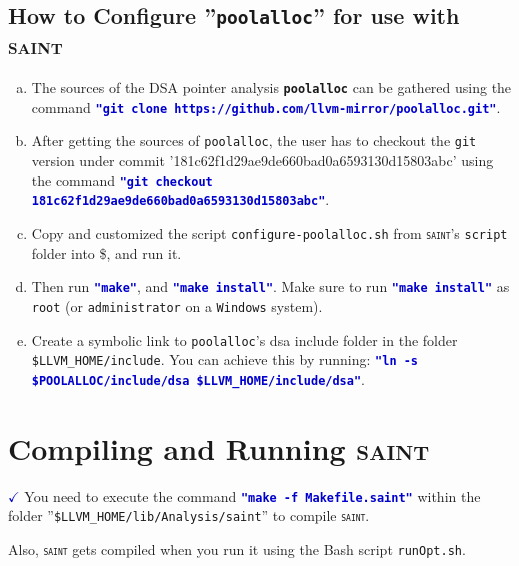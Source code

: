 \documentclass[12pt,onecolumn,a4paper]{article}
\newcommand{\saint}{\texttt{\textsc{saint}}\xspace}
\newcommand{\softwarenov}[1]{\texttt{\textbf{#1}}\xspace}
\newcommand{\tool}[1]{\texttt{#1}\xspace}
\newcommand{\command}[1]{\textcolor{mediumblue}{\texttt{\textbf{"#1"}}}\xspace}
\newcommand{\script}[1]{\texttt{#1}\xspace}
\newcommand{\envout}[1]{\textcolor{firebrickred}{\$\text{#1}}\xspace}
\newcommand{\mycheckmark}[1]{\textcolor{#1}{$\checkmark$}}
\begin{document}
\subsection{How to Configure ''\tool{poolalloc}'' for use with \textsc{saint}}
\begin{enumerate}[a)]
	\item The sources of the DSA pointer analysis \softwarenov{poolalloc}
	can be gathered using the command 
	\command{git clone https://github.com/llvm-mirror/poolalloc.git}.

	\item After getting the sources of \tool{poolalloc}, the user
	has to checkout the \tool{git} version under commit
	'181c62f1d29ae9de660bad0a6593130d15803abc' using the command
	\command{git checkout 181c62f1d29ae9de660bad0a6593130d15803abc}.

	\item Copy and customized the script \script{configure-poolalloc.sh}
	from \saint's \texttt{script} folder into \envout{POOLALLOC}, and
	run it.
	
	\item Then run \command{make}, and \command{make install}. Make sure
	to run \command{make install} as \texttt{root} (or \texttt{administrator}
	on a \texttt{Windows} system).
	
	\item Create a symbolic link to \tool{poolalloc}'s dsa include folder
	in the folder \texttt{\$LLVM\_HOME/include}.
	You can achieve this by running: 
	\command{ln -s \$POOLALLOC/include/dsa \$LLVM\_HOME/include/dsa}.
\end{enumerate}

\section{Compiling and Running \textsc{saint}}

\mycheckmark{mediumblue} You need to execute the command
\command{make -f Makefile.saint} within the
folder ''\texttt{\$LLVM\_HOME/lib/Analysis/saint}'' to compile
\saint.

Also, \saint gets compiled when you run it using
the Bash script \texttt{runOpt.sh}.
\end{document}
